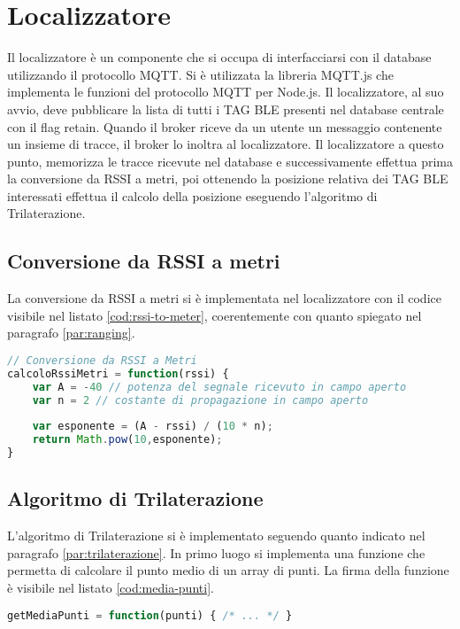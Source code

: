 \section{Localizzatore}
Il localizzatore è un componente che si occupa di interfacciarsi con il database utilizzando il protocollo MQTT. Si è utilizzata la libreria MQTT.js che implementa le funzioni del protocollo MQTT per Node.js. Il localizzatore, al suo avvio, deve pubblicare la lista di tutti i TAG BLE presenti nel database centrale con il flag retain.
Quando il broker riceve da un utente un messaggio contenente un insieme di tracce, il broker lo inoltra al localizzatore. Il localizzatore a questo punto, memorizza le tracce ricevute nel database e successivamente effettua prima la conversione da RSSI a metri, poi ottenendo la posizione relativa dei TAG BLE interessati effettua il calcolo della posizione eseguendo l'algoritmo di Trilaterazione.

\subsection{Conversione da RSSI a metri}
La conversione da RSSI a metri si è implementata nel localizzatore con il codice visibile nel listato \ref{cod:rssi-to-meter}, coerentemente con quanto spiegato nel paragrafo \ref{par:ranging}. 

\begin{lstlisting}[language=JavaScript, label=cod:rssi-to-meter, caption=Conversione da RSSI a Metri]
// Conversione da RSSI a Metri
calcoloRssiMetri = function(rssi) {
	var A = -40 // potenza del segnale ricevuto in campo aperto
	var n = 2 // costante di propagazione in campo aperto
	
	var esponente = (A - rssi) / (10 * n);
	return Math.pow(10,esponente);
}
\end{lstlisting}

\subsection{Algoritmo di Trilaterazione}
L'algoritmo di Trilaterazione si è implementato seguendo quanto indicato nel paragrafo \ref{par:trilaterazione}. In primo luogo si implementa una funzione che permetta di calcolare il punto medio di un array di punti. La firma della funzione è visibile nel listato \ref{cod:media-punti}.

\begin{lstlisting}[language=JavaScript, label=cod:media-punti, caption=Calcolo del punto medio]
getMediaPunti = function(punti) { /* ... */ }
\end{lstlisting}

